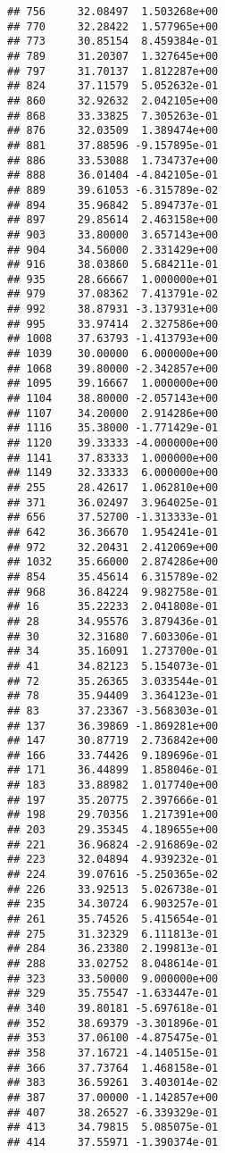 \documentclass[
]{article}
\begin{document}
\begin{verbatim}
## 756     32.08497  1.503268e+00
## 770     32.28422  1.577965e+00
## 773     30.85154  8.459384e-01
## 789     31.20307  1.327645e+00
## 797     31.70137  1.812287e+00
## 824     37.11579  5.052632e-01
## 860     32.92632  2.042105e+00
## 868     33.33825  7.305263e-01
## 876     32.03509  1.389474e+00
## 881     37.88596 -9.157895e-01
## 886     33.53088  1.734737e+00
## 888     36.01404 -4.842105e-01
## 889     39.61053 -6.315789e-02
## 894     35.96842  5.894737e-01
## 897     29.85614  2.463158e+00
## 903     33.80000  3.657143e+00
## 904     34.56000  2.331429e+00
## 916     38.03860  5.684211e-01
## 935     28.66667  1.000000e+01
## 979     37.08362  7.413791e-02
## 992     38.87931 -3.137931e+00
## 995     33.97414  2.327586e+00
## 1008    37.63793 -1.413793e+00
## 1039    30.00000  6.000000e+00
## 1068    39.80000 -2.342857e+00
## 1095    39.16667  1.000000e+00
## 1104    38.80000 -2.057143e+00
## 1107    34.20000  2.914286e+00
## 1116    35.38000 -1.771429e-01
## 1120    39.33333 -4.000000e+00
## 1141    37.83333  1.000000e+00
## 1149    32.33333  6.000000e+00
## 255     28.42617  1.062810e+00
## 371     36.02497  3.964025e-01
## 656     37.52700 -1.313333e-01
## 642     36.36670  1.954241e-01
## 972     32.20431  2.412069e+00
## 1032    35.66000  2.874286e+00
## 854     35.45614  6.315789e-02
## 968     36.84224  9.982758e-01
## 16      35.22233  2.041808e-01
## 28      34.95576  3.879436e-01
## 30      32.31680  7.603306e-01
## 34      35.16091  1.273700e-01
## 41      34.82123  5.154073e-01
## 72      35.26365  3.033544e-01
## 78      35.94409  3.364123e-01
## 83      37.23367 -3.568303e-01
## 137     36.39869 -1.869281e+00
## 147     30.87719  2.736842e+00
## 166     33.74426  9.189696e-01
## 171     36.44899  1.858046e-01
## 183     33.88982  1.017740e+00
## 197     35.20775  2.397666e-01
## 198     29.70356  1.217391e+00
## 203     29.35345  4.189655e+00
## 221     36.96824 -2.916869e-02
## 223     32.04894  4.939232e-01
## 224     39.07616 -5.250365e-02
## 226     33.92513  5.026738e-01
## 235     34.30724  6.903257e-01
## 261     35.74526  5.415654e-01
## 275     31.32329  6.111813e-01
## 284     36.23380  2.199813e-01
## 288     33.02752  8.048614e-01
## 323     33.50000  9.000000e+00
## 329     35.75547 -1.633447e-01
## 340     39.80181 -5.697618e-01
## 352     38.69379 -3.301896e-01
## 353     37.06100 -4.875475e-01
## 358     37.16721 -4.140515e-01
## 366     37.73764  1.468158e-01
## 383     36.59261  3.403014e-02
## 387     37.00000 -1.142857e+00
## 407     38.26527 -6.339329e-01
## 413     34.79815  5.085075e-01
## 414     37.55971 -1.390374e-01

\end{verbatim}
\end{document}
